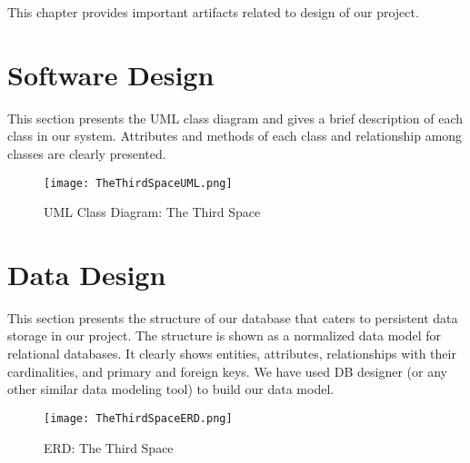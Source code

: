 This chapter provides important artifacts related to design of our project.

\section{Software Design}

This section presents the UML class diagram and gives a brief description of each class in our system. Attributes and methods of each class and relationship among classes are clearly presented.

\begin{figure}
  \caption{UML Class Diagram: The Third Space}
  \texttt{[image: TheThirdSpaceUML.png]}
  \centering
\end{figure}


\section{Data Design}

This section presents the structure of our database that caters to persistent data storage in our project. The structure is shown as a normalized data model for relational databases. It clearly shows entities, attributes, relationships with their cardinalities, and primary and foreign keys. We have used DB designer (or any other similar data modeling tool) to build our data model.
\begin{figure}
  \caption{ERD: The Third Space}
  \texttt{[image: TheThirdSpaceERD.png]}
  \centering
\end{figure}